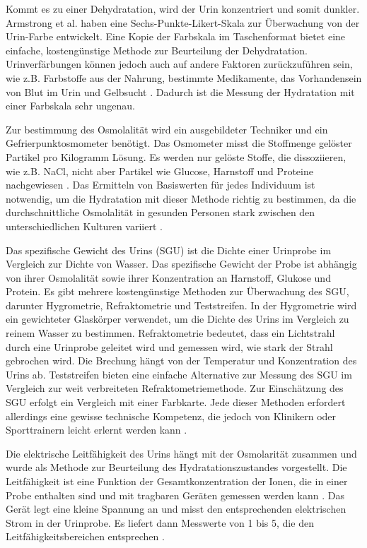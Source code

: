 \documentclass[10pt,a4paper,headinclude,twoside, plainheadsepline, open=right, numbers=noenddot, twocolumn]{article}
\begin{document}
Kommt es zu einer Dehydratation, wird der Urin konzentriert und somit dunkler.
Armstrong et al. \cite{armstrong1994urinary} haben eine Sechs-Punkte-Likert-Skala zur Überwachung von der Urin-Farbe entwickelt.
Eine Kopie der Farbskala im Taschenformat bietet eine einfache, kostengünstige Methode zur Beurteilung der Dehydratation.
Urinverfärbungen können jedoch auch auf andere Faktoren zurückzuführen sein, wie z.B. Farbstoffe aus der Nahrung, bestimmte Medikamente, das Vorhandensein von Blut im Urin und Gelbsucht \cite{garret2018engineering}.
Dadurch ist die Messung der Hydratation mit einer Farbskala sehr ungenau.

Zur bestimmung des Osmolalität wird ein ausgebildeter Techniker und ein Gefrierpunktosmometer benötigt.
Das Osmometer misst die Stoffmenge gelöster Partikel pro Kilogramm Lösung. 
Es werden nur gelöste Stoffe, die dissoziieren, wie z.B. NaCl, nicht aber Partikel wie Glucose, Harnstoff und Proteine nachgewiesen \cite{oppliger2002hydration}. 
Das Ermitteln von Basiswerten für jedes Individuum ist notwendig, um die Hydratation mit dieser Methode richtig zu bestimmen, da die durchschnittliche Osmolalität in gesunden Personen stark zwischen den unterschiedlichen Kulturen variiert \cite{garret2018engineering}.

Das spezifische Gewicht des Urins (SGU) ist die Dichte einer Urinprobe im Vergleich zur Dichte von Wasser.
Das spezifische Gewicht der Probe ist abhängig von ihrer Osmolalität sowie ihrer Konzentration an Harnstoff, Glukose und Protein. 
Es gibt mehrere kostengünstige Methoden zur Überwachung des SGU, darunter Hygrometrie, Refraktometrie und Teststreifen. 
In der Hygrometrie wird ein gewichteter Glaskörper verwendet, um die Dichte des Urins im Vergleich zu reinem Wasser zu bestimmen.
Refraktometrie bedeutet, dass ein Lichtstrahl durch eine Urinprobe geleitet wird und gemessen wird, wie stark der Strahl gebrochen wird.
Die Brechung hängt von der Temperatur und Konzentration des Urins ab.
Teststreifen bieten eine einfache Alternative zur Messung des SGU im Vergleich zur weit verbreiteten Refraktometriemethode.
Zur Einschätzung des SGU erfolgt ein Vergleich mit einer Farbkarte.
Jede dieser Methoden erfordert allerdings eine gewisse technische Kompetenz, die jedoch von Klinikern oder Sporttrainern leicht erlernt werden kann \cite{oppliger2002hydration}.

Die elektrische Leitfähigkeit des Urins hängt mit der Osmolarität zusammen und wurde als Methode zur Beurteilung des Hydratationszustandes vorgestellt.
Die Leitfähigkeit ist eine Funktion der Gesamtkonzentration der Ionen, die in einer Probe enthalten sind und mit tragbaren Geräten  gemessen werden kann \cite{shirreffs1998urine}.
Das Gerät legt eine kleine Spannung an und misst den entsprechenden elektrischen Strom in der Urinprobe.
Es liefert dann Messwerte von 1 bis 5, die den Leitfähigkeitsbereichen entsprechen \cite{garret2018engineering}.
\end{document}
